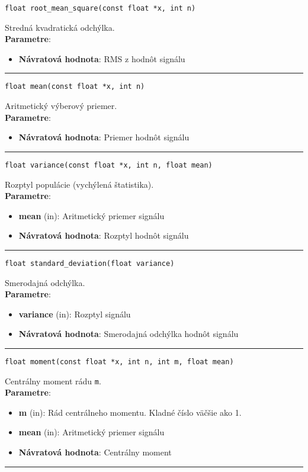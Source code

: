 \begin{lstlisting}[style=docs]
float root_mean_square(const float *x, int n)
\end{lstlisting}
Stredná kvadratická odchýlka. \\ 
\textbf{Parametre}:
\begin{itemize}[noitemsep, topsep=0pt]
	\item \textbf{Návratová hodnota}:  RMS z hodnôt signálu
\end{itemize}
\bigbreak
\hrule

\begin{lstlisting}[style=docs]
float mean(const float *x, int n)
\end{lstlisting}
Aritmetický výberový priemer. \\ 
\textbf{Parametre}:
\begin{itemize}[noitemsep, topsep=0pt]
	\item \textbf{Návratová hodnota}:  Priemer hodnôt signálu
\end{itemize}
\bigbreak
\hrule

\begin{lstlisting}[style=docs]
float variance(const float *x, int n, float mean)
\end{lstlisting}
Rozptyl populácie (vychýlená štatistika). \\ 
\textbf{Parametre}:
\begin{itemize}[noitemsep, topsep=0pt]
	\item \textbf{mean} (in): Aritmetický priemer signálu
	\item \textbf{Návratová hodnota}:  Rozptyl hodnôt signálu
\end{itemize}
\bigbreak
\hrule

\begin{lstlisting}[style=docs]
float standard_deviation(float variance)
\end{lstlisting}
Smerodajná odchýlka. \\ 
\textbf{Parametre}:
\begin{itemize}[noitemsep, topsep=0pt]
	\item \textbf{variance} (in): Rozptyl signálu
	\item \textbf{Návratová hodnota}:  Smerodajná odchýlka hodnôt signálu
\end{itemize}
\bigbreak
\hrule

\begin{lstlisting}[style=docs]
float moment(const float *x, int n, int m, float mean)
\end{lstlisting}
Centrálny moment rádu \verb|m|. \\ 
\textbf{Parametre}:
\begin{itemize}[noitemsep, topsep=0pt]
	\item \textbf{m} (in): Rád centrálneho momentu. Kladné číslo väčšie ako 1.
	\item \textbf{mean} (in): Aritmetický priemer signálu
	\item \textbf{Návratová hodnota}:  Centrálny moment
\end{itemize}
\bigbreak
\hrule

